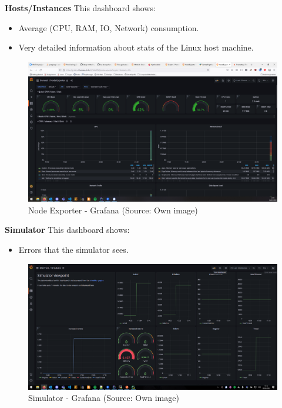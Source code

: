 \textbf{Hosts/Instances}
This dashboard shows:
\begin{itemize}
    \item Average (CPU, RAM, IO, Network) consumption.
    \item Very detailed information about stats of the Linux host machine.
\end{itemize}
\begin{figure}[H]
    \centering
    \includegraphics[width = \linewidth]{images/monitoring/node_exporter_1.png}
    \caption{Node Exporter - Grafana (Source: Own image)}
    \label{fig:grafana-dashboard-NodeExporter}
\end{figure}
\newpage
\textbf{Simulator}
This dashboard shows:
\begin{itemize}
    \item Errors that the simulator sees.
\end{itemize}
\begin{figure}[H]
    \centering
    \includegraphics[width = \linewidth]{images/monitoring/simulator_1.png}
    \caption{Simulator - Grafana (Source: Own image)}
    \label{fig:grafana-dashboard-Simulator}
\end{figure}

